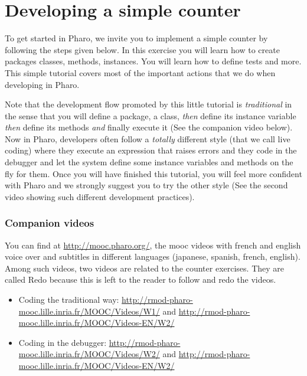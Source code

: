 \documentclass[10pt,twoside,english]{_support/latex/sbabook/sbabook}
\begin{document}
\frontmatter
\pagestyle{plain}

\tableofcontents*
\clearpage\listoffigures

\mainmatter

\chapter{Developing a simple counter}
To get started in Pharo, we invite you to implement a simple counter by following the steps given below. In this exercise you will learn how to create packages classes, methods, instances. You will learn how to define tests and more. This simple tutorial covers most of the important actions that we do when developing in Pharo. 

Note that the development flow promoted by this little tutorial is \textit{traditional} in the sense that you will define a package, a class, \textit{then} define its instance variable \textit{then} define its methods \textit{and} finally execute it (See the companion video below). Now in Pharo, developers often follow a \textit{totally} different style (that we call live coding) where they execute an expression that raises errors and they code in the debugger and let the system define some instance variables and methods on the fly for them. Once you will have finished this tutorial, you will feel more confident with Pharo and we strongly suggest you to try the other style (See the second video showing such different development practices).
\subsection{Companion videos}
You can find at \url{http://mooc.pharo.org/}, the mooc videos with french and english voice over and subtitles in different languages (japanese, spanish, french, english).
Among such videos, two videos are related to the counter exercises. They are called Redo because this is left to the reader to follow and redo the 
videos. 

\begin{itemize}
\item Coding the traditional way: \url{http://rmod-pharo-mooc.lille.inria.fr/MOOC/Videos/W1/} and \url{http://rmod-pharo-mooc.lille.inria.fr/MOOC/Videos-EN/W2/}
\item Coding in the debugger: \url{http://rmod-pharo-mooc.lille.inria.fr/MOOC/Videos/W2/} and \url{http://rmod-pharo-mooc.lille.inria.fr/MOOC/Videos-EN/W2/}
\end{itemize}
\end{document}

